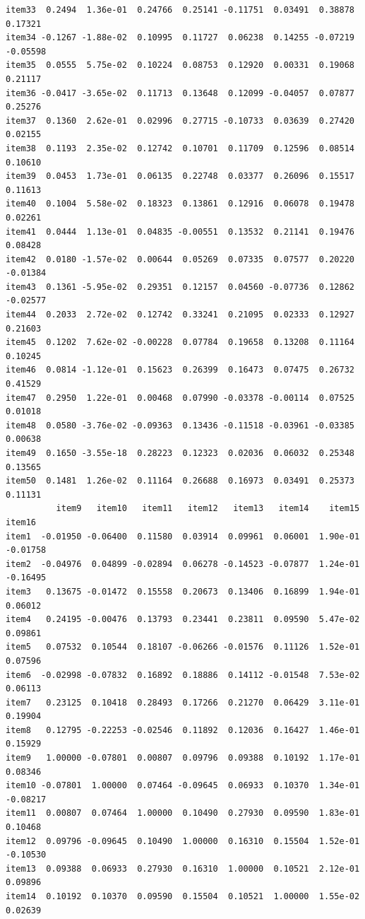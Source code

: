 \documentclass[
  a4paper,
]{ltjsbook}
\begin{document}
\begin{verbatim}
item33  0.2494  1.36e-01  0.24766  0.25141 -0.11751  0.03491  0.38878  0.17321
item34 -0.1267 -1.88e-02  0.10995  0.11727  0.06238  0.14255 -0.07219 -0.05598
item35  0.0555  5.75e-02  0.10224  0.08753  0.12920  0.00331  0.19068  0.21117
item36 -0.0417 -3.65e-02  0.11713  0.13648  0.12099 -0.04057  0.07877  0.25276
item37  0.1360  2.62e-01  0.02996  0.27715 -0.10733  0.03639  0.27420  0.02155
item38  0.1193  2.35e-02  0.12742  0.10701  0.11709  0.12596  0.08514  0.10610
item39  0.0453  1.73e-01  0.06135  0.22748  0.03377  0.26096  0.15517  0.11613
item40  0.1004  5.58e-02  0.18323  0.13861  0.12916  0.06078  0.19478  0.02261
item41  0.0444  1.13e-01  0.04835 -0.00551  0.13532  0.21141  0.19476  0.08428
item42  0.0180 -1.57e-02  0.00644  0.05269  0.07335  0.07577  0.20220 -0.01384
item43  0.1361 -5.95e-02  0.29351  0.12157  0.04560 -0.07736  0.12862 -0.02577
item44  0.2033  2.72e-02  0.12742  0.33241  0.21095  0.02333  0.12927  0.21603
item45  0.1202  7.62e-02 -0.00228  0.07784  0.19658  0.13208  0.11164  0.10245
item46  0.0814 -1.12e-01  0.15623  0.26399  0.16473  0.07475  0.26732  0.41529
item47  0.2950  1.22e-01  0.00468  0.07990 -0.03378 -0.00114  0.07525  0.01018
item48  0.0580 -3.76e-02 -0.09363  0.13436 -0.11518 -0.03961 -0.03385  0.00638
item49  0.1650 -3.55e-18  0.28223  0.12323  0.02036  0.06032  0.25348  0.13565
item50  0.1481  1.26e-02  0.11164  0.26688  0.16973  0.03491  0.25373  0.11131
          item9   item10   item11   item12   item13   item14    item15   item16
item1  -0.01950 -0.06400  0.11580  0.03914  0.09961  0.06001  1.90e-01 -0.01758
item2  -0.04976  0.04899 -0.02894  0.06278 -0.14523 -0.07877  1.24e-01 -0.16495
item3   0.13675 -0.01472  0.15558  0.20673  0.13406  0.16899  1.94e-01  0.06012
item4   0.24195 -0.00476  0.13793  0.23441  0.23811  0.09590  5.47e-02  0.09861
item5   0.07532  0.10544  0.18107 -0.06266 -0.01576  0.11126  1.52e-01  0.07596
item6  -0.02998 -0.07832  0.16892  0.18886  0.14112 -0.01548  7.53e-02  0.06113
item7   0.23125  0.10418  0.28493  0.17266  0.21270  0.06429  3.11e-01  0.19904
item8   0.12795 -0.22253 -0.02546  0.11892  0.12036  0.16427  1.46e-01  0.15929
item9   1.00000 -0.07801  0.00807  0.09796  0.09388  0.10192  1.17e-01  0.08346
item10 -0.07801  1.00000  0.07464 -0.09645  0.06933  0.10370  1.34e-01 -0.08217
item11  0.00807  0.07464  1.00000  0.10490  0.27930  0.09590  1.83e-01  0.10468
item12  0.09796 -0.09645  0.10490  1.00000  0.16310  0.15504  1.52e-01 -0.10530
item13  0.09388  0.06933  0.27930  0.16310  1.00000  0.10521  2.12e-01  0.09896
item14  0.10192  0.10370  0.09590  0.15504  0.10521  1.00000  1.55e-02  0.02639

\end{verbatim}
\end{document}
